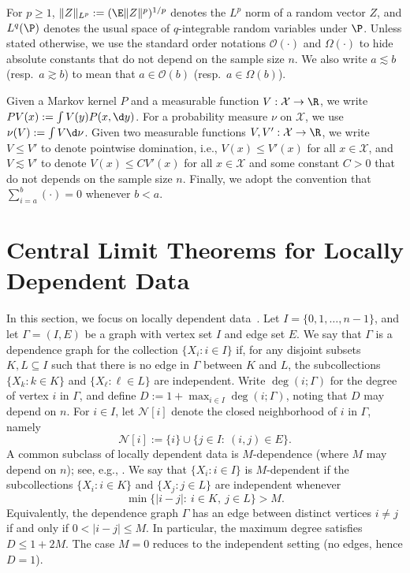 \documentclass[mnsc,nonblindrev]{informs3}
\begin{document}
For $p\ge1$, $\|Z\|_{L^p}:=(\E\|Z\|^p)^{1/p}$ denotes the $L^p$ norm of a random
vector $Z$, and $L^q(\P)$ denotes the usual space of $q$-integrable random
variables under $\P$. Unless stated otherwise, we use the standard order notations
$\mathcal O(\cdot)$ and $\Omega(\cdot)$ to hide absolute constants that do not
depend on the sample size $n$. We also write $a\lesssim b$ (resp.\ $a\gtrsim b$)
to mean that $a\in\mathcal O(b)$ (resp.\ $a\in\Omega(b)$).


Given a Markov kernel $P$ and a measurable function $V:\mathcal X\to\R$, we write
$PV(x):=\int V(y)P(x,\d y)$. For a probability measure $\nu$ on $\mathcal X$, we use
$\nu(V):=\int V\d\nu$. Given two measurable functions $V,V':\mathcal X\to\R$, we write $V\le V'$ to
denote pointwise domination, i.e., $V(x)\le V'(x)$ for all $x\in\mathcal X$, and
$V\lesssim V'$ to denote $V(x)\le CV'(x)$ for all $x\in\mathcal X$ and some
 constant $C>0$ that do not depends on the sample size $n$. Finally, we adopt the convention that
$\sum_{i=a}^b(\cdot)=0$ whenever $b<a$.


\section{Central Limit Theorems for Locally Dependent Data}\label{sec:local-dependent}
In this section, we focus on locally dependent data~\citep{rinott1994normal}. Let $I=\{0,1,\dots,n-1\}$, and let
$\Gamma=(I,E)$ be a graph with vertex set $I$ and edge set $E$. We say that
$\Gamma$ is a dependence graph for the collection $\{X_i:i\in I\}$ if, for
any disjoint subsets $K,L\subseteq I$ such that there is no edge in $\Gamma$
between $K$ and $L$, the subcollections $\{X_k:k\in K\}$ and $\{X_\ell:\ell\in L\}$
are independent. Write $\deg(i;\Gamma)$ for the degree of vertex $i$ in $\Gamma$, and define $D :=1+\max_{i \in I} \operatorname{deg}(i;\Gamma)$, noting that $D$ may depend on $n$. For $i\in I$, let $\mathcal N[i]$ denote the
closed neighborhood of $i$ in $\Gamma$, namely
\[
\mathcal N[i]:=\{i\}\cup\{j\in I:\ (i,j)\in E\}.
\]
A common subclass of locally dependent data is $M$-dependence (where $M$
may depend on $n$); see, e.g., \cite{diananda1955central,romano2000more}. We say
that $\{X_i:i\in I\}$ is $M$-dependent if the subcollections
$\{X_i:i\in K\}$ and $\{X_j:j\in L\}$ are independent whenever
\[
\min\{|i-j|:\ i\in K,\ j\in L\}>M.
\]
Equivalently, the dependence graph $\Gamma$ has an edge between distinct
vertices $i\neq j$ if and only if $0<|i-j|\le M$. In particular, the maximum
degree satisfies $D\le 1+2M$. The case $M=0$ reduces to the independent
setting (no edges, hence $D=1$).
\end{document}
